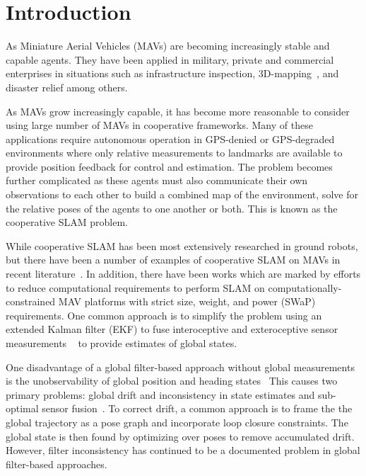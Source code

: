 
\section{Introduction}
As Miniature Aerial Vehicles (MAVs) are becoming increasingly stable and capable agents. They have been applied in military, private and commercial enterprises in situations such as infrastructure inspection\cite{Steich2016, Ham2016}, 3D-mapping~\cite{Remondino2011}, and disaster relief\cite{Adams2011} among others.

As MAVs grow increasingly capable, it has become more reasonable to consider using large number of MAVs in cooperative frameworks. Many of these applications require autonomous operation in GPS-denied or GPS-degraded environments where only relative measurements to landmarks are available to provide position feedback for control and estimation.  The problem becomes further complicated as these agents must also communicate their own observations to each other to build a combined map of the environment, solve for the relative poses of the agents to one another or both. This is known as the cooperative SLAM problem.

While cooperative SLAM has been most extensively researched in ground robots, but there have been a number of examples of cooperative SLAM on MAVs in recent literature~\cite{Loianno2015, Achtelik2012, Lawson2015}. In addition, there have been works which are marked by efforts to reduce computational requirements to perform SLAM on computationally-constrained MAV platforms with strict size, weight, and power (SWaP) requirements.  One common approach is to simplify the problem using an extended Kalman filter (EKF) to fuse interoceptive and exteroceptive sensor measurements
~\cite{Bachrach2010a, Wheeler2017b, Achtelik2009, Ahrens2009, Chowdary2013} to provide estimates of global states.

One disadvantage of a global filter-based approach without global measurements is the unobservability of global position and heading states~\cite{Martinelli2012,Weiss2012,Jones2007} This causes two primary problems: global drift and inconsistency in state estimates and sub-optimal sensor fusion~\cite{Bailey2006Consistency,Bar-Shalom2002}. To correct drift, a common approach is to frame the the global trajectory as a pose graph and incorporate loop closure constraints.  The global state is then found by optimizing over poses to remove accumulated drift.  However, filter inconsistency has continued to be a documented problem in global filter-based approaches.

